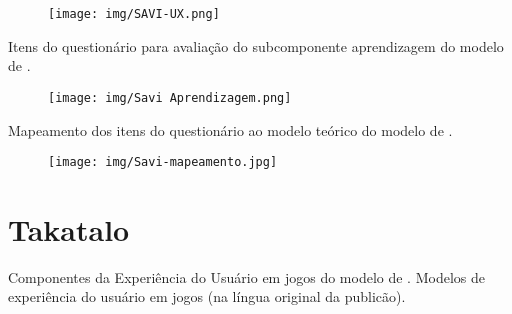 \begin{figure}[h]
	\centering
	\texttt{[image: img/SAVI-UX.png]}
	\label{fig:anexo2}\\
\end{figure}

\newpage


Itens do questionário para avaliação do subcomponente aprendizagem do modelo de .\label{chap:A3}

\begin{figure}[h]
	\centering
	\texttt{[image: img/Savi Aprendizagem.png]}
	\label{fig:anexo3}\\
\end{figure}

\newpage


Mapeamento dos itens do questionário ao modelo teórico do modelo de .\label{chap:A4}

\begin{figure}[h]
	\centering
	\texttt{[image: img/Savi-mapeamento.jpg]}
	\label{fig:anexo4}\\
\end{figure}

\newpage

\chapter{Takatalo}
\label{chap:A5}
Componentes da Experiência do Usuário em jogos do modelo de .
Modelos de experiência do usuário em jogos (na língua original da publicão). 

